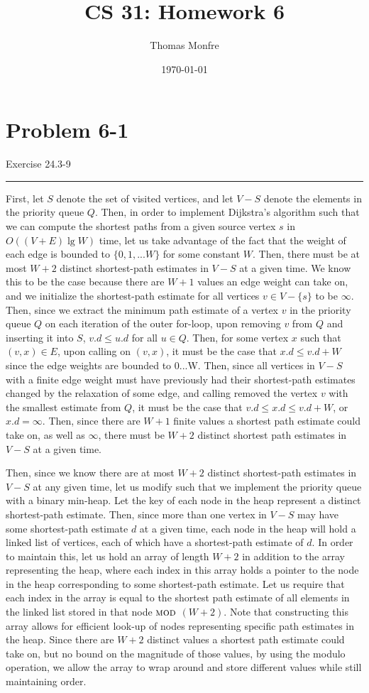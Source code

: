 \documentclass[11pt]{article}
\title{CS 31: Homework 6}
\author{Thomas Monfre}
\date{\today}
\def\separateline{\medskip\hrule\medskip}
\begin{document}
\maketitle

\section{Problem 6-1}
Exercise 24.3-9
\separateline

First, let $S$ denote the set of visited vertices, and let $V - S$ denote the elements in the priority queue $Q$. Then, in order to implement Dijkstra's algorithm such that we can compute the shortest paths from a given source vertex $s$ in $O((V+E)\lg{W})$ time, let us take advantage of the fact that the weight of each edge is bounded to $\{0,1,...W\}$ for some constant $W$. Then, there must be at most $W + 2$ distinct shortest-path estimates in $V - S$ at a given time. We know this to be the case because there are $W+1$ values an edge weight can take on, and we initialize the shortest-path estimate for all vertices $v \in V - \{s\}$ to be $\infty$. Then, since we extract the minimum path estimate of a vertex $v$ in the priority queue $Q$ on each iteration of the outer for-loop, upon removing $v$ from $Q$ and inserting it into $S$, $v.d \leq u.d$ for all $u \in Q$. Then, for some vertex $x$ such that $(v,x) \in E$, upon calling  on $(v,x)$, it must be the case that $x.d \leq v.d + W$ since the edge weights are bounded to 0...W. Then, since all vertices in $V - S$ with a finite edge weight must have previously had their shortest-path estimates changed by the relaxation of some edge, and calling  removed the vertex $v$ with the smallest estimate from $Q$, it must be the case that $v.d \leq x.d \leq v.d + W$, or $x.d = \infty$. Then, since there are $W+1$ finite values a shortest path estimate could take on, as well as $\infty$, there must be $W+2$ distinct shortest path estimates in $V - S$ at a given time.

Then, since we know there are at most $W+2$ distinct shortest-path estimates in $V - S$ at any given time, let us modify  such that we implement the priority queue with a binary min-heap. Let the key of each node in the heap represent a distinct shortest-path estimate. Then, since more than one vertex in $V - S$ may have some shortest-path estimate $d$ at a given time, each node in the heap will hold a linked list of vertices, each of which have a shortest-path estimate of $d$. In order to maintain this, let us hold an array of length $W+2$ in addition to the array representing the heap, where each index in this array holds a pointer to the node in the heap corresponding to some shortest-path estimate. Let us require that each index in the array is equal to the shortest path estimate of all elements in the linked list stored in that node $\textnormal{\scshape mod}$ $(W+2)$. Note that constructing this array allows for efficient look-up of nodes representing specific path estimates in the heap. Since there are $W+2$ distinct values a shortest path estimate could take on, but no bound on the magnitude of those values, by using the modulo operation, we allow the array to wrap around and store different values while still maintaining order.
\end{document}
